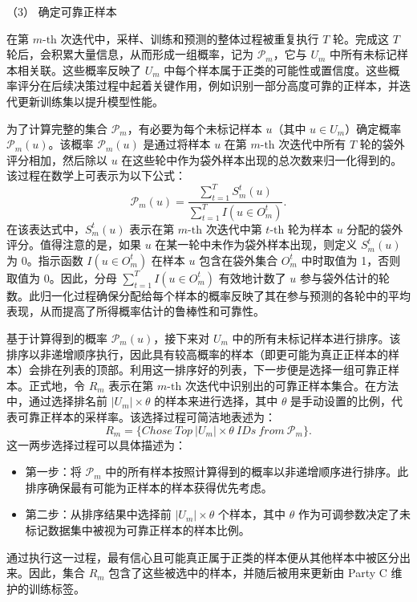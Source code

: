 （3） 确定可靠正样本

在第 $m\text{-th}$ 次迭代中，采样、训练和预测的整体过程被重复执行 $T$ 轮。完成这 $T$ 轮后，会积累大量信息，从而形成一组概率，记为 ${{\mathsf{\mathcal{P}}}_{m}}$，它与 ${{U}_{m}}$ 中所有未标记样本相关联。这些概率反映了 ${{U}_{m}}$ 中每个样本属于正类的可能性或置信度。这些概率评分在后续决策过程中起着关键作用，例如识别一部分高度可靠的正样本，并迭代更新训练集以提升模型性能。

为了计算完整的集合 ${{\mathsf{\mathcal{P}}}_{m}}$，有必要为每个未标记样本 $u$（其中 $u\in {{U}_{m}}$）确定概率 ${{\mathsf{\mathcal{P}}}_{m}}(u)$。该概率 ${{\mathsf{\mathcal{P}}}_{m}}(u)$ 是通过将样本 $u$ 在第 $m\text{-th}$ 次迭代中所有 $T$ 轮的袋外评分相加，然后除以 $u$ 在这些轮中作为袋外样本出现的总次数来归一化得到的。该过程在数学上可表示为以下公式：
\begin{equation}
	{{\mathsf{\mathcal{P}}}_{m}}(u)=\frac{\sum\nolimits_{t=1}^{T}{S_{m}^{t}}(u)}{\sum\nolimits_{t=1}^{T}{I(u\in O_{m}^{t})}}.
\end{equation}
在该表达式中，$S_{m}^{t}(u)$ 表示在第 $m\text{-th}$ 次迭代中第 $t\text{-th}$ 轮为样本 $u$ 分配的袋外评分。值得注意的是，如果 $u$ 在某一轮中未作为袋外样本出现，则定义 $S_{m}^{t}(u)$ 为 0。指示函数 $I(u\in O_{m}^{t})$ 在样本 $u$ 包含在袋外集合 $O_{m}^{t}$ 中时取值为 1，否则取值为 0。因此，分母 $\sum\nolimits_{t=1}^{T}{I(u\in O_{m}^{t})}$ 有效地计数了 $u$ 参与袋外估计的轮数。此归一化过程确保分配给每个样本的概率反映了其在参与预测的各轮中的平均表现，从而提高了所得概率估计的鲁棒性和可靠性。

基于计算得到的概率 ${{\mathsf{\mathcal{P}}}_{m}}(u)$，接下来对 ${{U}_{m}}$ 中的所有未标记样本进行排序。该排序以非递增顺序执行，因此具有较高概率的样本（即更可能为真正正样本的样本）会排在列表的顶部。利用这一排序好的列表，下一步便是选择一组可靠正样本。正式地，令 ${{R}_{m}}$ 表示在第 $m\text{-th}$ 次迭代中识别出的可靠正样本集合。在方法中，通过选择排名前 $|{{U}_{m}}|\times \theta$ 的样本来进行选择，其中 $\theta$ 是手动设置的比例，代表可靠正样本的采样率。该选择过程可简洁地表述为：
\begin{equation}
	{{R}_{m}}=\{Chose\ Top\ |{{U}_{m}}|\times \theta \ IDs\ from\ {{\mathsf{\mathcal{P}}}_{m}}\}.
\end{equation}
这一两步选择过程可以具体描述为：
\begin{itemize}
	\item 第一步：将 ${{\mathsf{\mathcal{P}}}_{m}}$ 中的所有样本按照计算得到的概率以非递增顺序进行排序。此排序确保最有可能为正样本的样本获得优先考虑。
	
	\item 第二步：从排序结果中选择前 $|{{U}_{m}}|\times \theta$ 个样本，其中 $\theta$ 作为可调参数决定了未标记数据集中被视为可靠正样本的样本比例。
\end{itemize}
通过执行这一过程，最有信心且可能真正属于正类的样本便从其他样本中被区分出来。因此，集合 ${{R}_{m}}$ 包含了这些被选中的样本，并随后被用来更新由 Party C 维护的训练标签。

